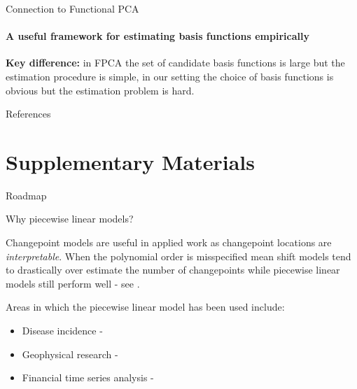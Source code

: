 \documentclass{beamer}
\begin{document}

\begin{frame}{Connection to Functional PCA}
\framesubtitle{A useful framework for estimating basis functions empirically}

\centering 
\textbf{Key difference:} in FPCA the set of candidate basis functions is large but the estimation procedure is simple, in our setting the choice of basis functions is obvious but the estimation problem is hard. 

\end{frame}




\begin{frame}
	
\end{frame}




\begin{frame}[allowframebreaks]{References}


\end{frame}




\section{Supplementary Materials}




\begin{frame}{Roadmap}
\tableofcontents[currentsection]
\end{frame}




\begin{frame}{Why piecewise linear models?}

Changepoint models are useful in applied work as changepoint locations are \textit{interpretable}. When the polynomial order is misspecified mean shift models tend to drastically over estimate the number of changepoints while piecewise linear models still perform well - see \cite{Baranowski}. 

\bigskip

Areas in which the piecewise linear model has been used include: 

\begin{itemize}
	\item Disease incidence - \cite{Dass2015}
	\item Geophysical research - \cite{liu2010piecewise}
	\item Financial time series analysis - \cite{yin2011financial}
\end{itemize}


\end{frame}
\end{document}
